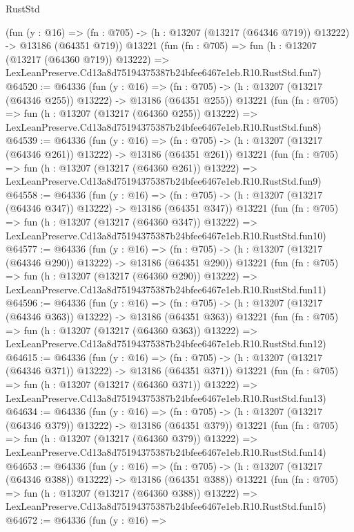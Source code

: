 \begin{lexlean}{RustStd}
\begin{coremodule}
    (fun (y : @16) =>
    (fn : @705) -> (h : @13207 (@13217 (@64346 @719)) @13222) -> @13186 (@64351 @719))
    @13221
    (fun (fn : @705) =>
    fun (h : @13207 (@13217 (@64360 @719)) @13222) =>
    LexLeanPreserve.Cd13a8d75194375387b24bfee6467e1eb.R10.RustStd.fun7)
@64520 := @64336
    (fun (y : @16) =>
    (fn : @705) -> (h : @13207 (@13217 (@64346 @255)) @13222) -> @13186 (@64351 @255))
    @13221
    (fun (fn : @705) =>
    fun (h : @13207 (@13217 (@64360 @255)) @13222) =>
    LexLeanPreserve.Cd13a8d75194375387b24bfee6467e1eb.R10.RustStd.fun8)
@64539 := @64336
    (fun (y : @16) =>
    (fn : @705) -> (h : @13207 (@13217 (@64346 @261)) @13222) -> @13186 (@64351 @261))
    @13221
    (fun (fn : @705) =>
    fun (h : @13207 (@13217 (@64360 @261)) @13222) =>
    LexLeanPreserve.Cd13a8d75194375387b24bfee6467e1eb.R10.RustStd.fun9)
@64558 := @64336
    (fun (y : @16) =>
    (fn : @705) -> (h : @13207 (@13217 (@64346 @347)) @13222) -> @13186 (@64351 @347))
    @13221
    (fun (fn : @705) =>
    fun (h : @13207 (@13217 (@64360 @347)) @13222) =>
    LexLeanPreserve.Cd13a8d75194375387b24bfee6467e1eb.R10.RustStd.fun10)
@64577 := @64336
    (fun (y : @16) =>
    (fn : @705) -> (h : @13207 (@13217 (@64346 @290)) @13222) -> @13186 (@64351 @290))
    @13221
    (fun (fn : @705) =>
    fun (h : @13207 (@13217 (@64360 @290)) @13222) =>
    LexLeanPreserve.Cd13a8d75194375387b24bfee6467e1eb.R10.RustStd.fun11)
@64596 := @64336
    (fun (y : @16) =>
    (fn : @705) -> (h : @13207 (@13217 (@64346 @363)) @13222) -> @13186 (@64351 @363))
    @13221
    (fun (fn : @705) =>
    fun (h : @13207 (@13217 (@64360 @363)) @13222) =>
    LexLeanPreserve.Cd13a8d75194375387b24bfee6467e1eb.R10.RustStd.fun12)
@64615 := @64336
    (fun (y : @16) =>
    (fn : @705) -> (h : @13207 (@13217 (@64346 @371)) @13222) -> @13186 (@64351 @371))
    @13221
    (fun (fn : @705) =>
    fun (h : @13207 (@13217 (@64360 @371)) @13222) =>
    LexLeanPreserve.Cd13a8d75194375387b24bfee6467e1eb.R10.RustStd.fun13)
@64634 := @64336
    (fun (y : @16) =>
    (fn : @705) -> (h : @13207 (@13217 (@64346 @379)) @13222) -> @13186 (@64351 @379))
    @13221
    (fun (fn : @705) =>
    fun (h : @13207 (@13217 (@64360 @379)) @13222) =>
    LexLeanPreserve.Cd13a8d75194375387b24bfee6467e1eb.R10.RustStd.fun14)
@64653 := @64336
    (fun (y : @16) =>
    (fn : @705) -> (h : @13207 (@13217 (@64346 @388)) @13222) -> @13186 (@64351 @388))
    @13221
    (fun (fn : @705) =>
    fun (h : @13207 (@13217 (@64360 @388)) @13222) =>
    LexLeanPreserve.Cd13a8d75194375387b24bfee6467e1eb.R10.RustStd.fun15)
@64672 := @64336
    (fun (y : @16) =>

\end{coremodule}
\end{lexlean}
